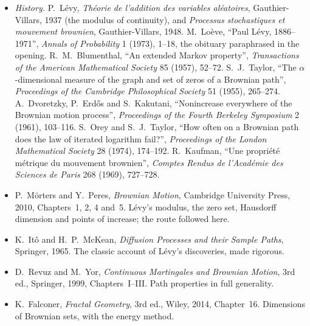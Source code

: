 \begin{itemize}
\item \emph{History.} P.~L\'evy, \emph{Th\'eorie de l'addition des variables al\'eatoires}, Gauthier-Villars, 1937 (the modulus of continuity), and \emph{Processus stochastiques et mouvement brownien},
Gauthier-Villars, 1948. M.~Lo\`eve, ``Paul L\'evy, 1886--1971'', \emph{Annals of Probability} 1 (1973), 1--18, the obituary paraphrased in the opening. R.~M.~Blumenthal, ``An extended Markov property'',
\emph{Transactions of the American Mathematical Society} 85 (1957), 52--72. S.~J.~Taylor, ``The $\alpha$-dimensional measure of the graph and set of zeros of a Brownian path'', \emph{Proceedings of the Cambridge
Philosophical Society} 51 (1955), 265--274. A.~Dvoretzky, P.~Erd\H{o}s and S.~Kakutani, ``Nonincrease everywhere of the Brownian motion process'', \emph{Proceedings of the Fourth Berkeley Symposium} 2 (1961),
103--116. S.~Orey and S.~J.~Taylor, ``How often on a Brownian path does the law of iterated logarithm fail?'', \emph{Proceedings of the London Mathematical Society} 28 (1974), 174--192. R.~Kaufman, ``Une propri\'et\'e
m\'etrique du mouvement brownien'', \emph{Comptes Rendus de l'Acad\'emie des Sciences de Paris} 268 (1969), 727--728.
\item P.~M\"orters and Y.~Peres, \emph{Brownian Motion}, Cambridge University Press, 2010, Chapters~1, 2, 4 and~5. L\'evy's modulus, the zero set, Hausdorff dimension and points of increase; the route followed here.
\item K.~It\^o and H.~P.~McKean, \emph{Diffusion Processes and their Sample Paths}, Springer, 1965. The classic account of L\'evy's discoveries, made rigorous.
\item D.~Revuz and M.~Yor, \emph{Continuous Martingales and Brownian Motion}, 3rd ed., Springer, 1999, Chapters~I--III. Path properties in full generality.
\item K.~Falconer, \emph{Fractal Geometry}, 3rd ed., Wiley, 2014, Chapter~16. Dimensions of Brownian sets, with the energy method.
\end{itemize}
